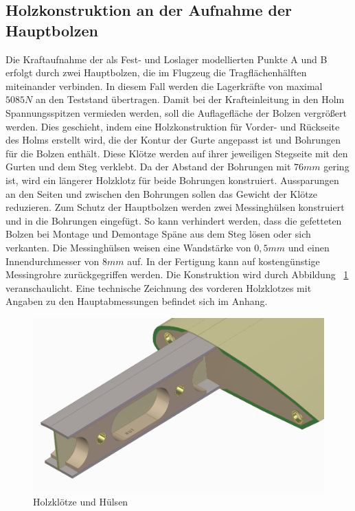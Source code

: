 \subsection{Holzkonstruktion an der Aufnahme der Hauptbolzen}
Die Kraftaufnahme der  als Fest- und Loslager modellierten Punkte A und B erfolgt durch zwei Hauptbolzen, die im Flugzeug die Tragflächenhälften miteinander verbinden. In diesem Fall werden die Lagerkräfte von maximal $ 5085N $ an den Teststand übertragen. Damit bei der Krafteinleitung in den Holm Spannungsspitzen vermieden werden, soll die Auflagefläche der Bolzen vergrößert werden. Dies geschieht, indem eine Holzkonstruktion für Vorder- und Rückseite des Holms erstellt wird, die der Kontur der Gurte angepasst ist und Bohrungen für die Bolzen enthält. Diese Klötze werden auf ihrer jeweiligen Stegseite mit den Gurten und dem Steg verklebt. Da der Abstand der Bohrungen mit $ 76mm $ gering ist, wird ein längerer Holzklotz für beide Bohrungen konstruiert. Aussparungen an den Seiten und zwischen den Bohrungen sollen das Gewicht der Klötze reduzieren. Zum Schutz der Hauptbolzen werden zwei Messinghülsen konstruiert und in die Bohrungen eingefügt. So kann verhindert werden, dass die gefetteten Bolzen bei Montage und Demontage Späne aus dem Steg lösen oder sich verkanten. Die Messinghülsen weisen eine Wandstärke von $ 0,5mm $ und einen Innendurchmesser von $ 8mm $ auf. In der Fertigung kann auf kostengünstige Messingrohre zurückgegriffen werden. Die Konstruktion wird durch Abbildung ~\ref{fig: Klotz} veranschaulicht. Eine technische Zeichnung des vorderen Holzklotzes mit Angaben zu den Hauptabmessungen befindet sich im Anhang.
\begin{figure}[h]
	\includegraphics[width=1.0\textwidth]{Bilder/Klotz.jpg}
	\caption{Holzklötze und Hülsen}
	\label{fig: Klotz}
\end{figure}

